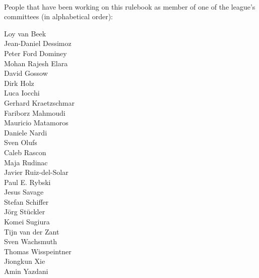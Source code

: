 ~\\\noindent People that have been working on this rulebook as member of one of the league's 
committees (in alphabetical order):
\begin{multicols}{2}%
\noindent%
Loy van Beek\\
Jean-Daniel Dessimoz\\
Peter Ford Dominey\\
Mohan Rajesh Elara\\
David Gossow\\
Dirk Holz\\
Luca Iocchi\\
Gerhard Kraetzschmar\\
Fariborz Mahmoudi\\
Mauricio Matamoros\\
Daniele Nardi\\
Sven Olufs\\
Caleb Rascon\\
Maja Rudinac\\
Javier Ruiz-del-Solar\\
Paul E. Rybski\\
Jesus Savage\\
Stefan Schiffer\\
J\"org St\"uckler\\
Komei Sugiura\\
Tijn van der Zant\\
Sven Wachsmuth\\
Thomas Wisspeintner\\ 
Jiongkun Xie\\
Amin Yazdani
\end{multicols}
